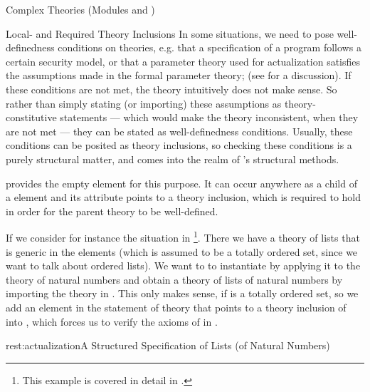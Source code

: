 \begin{tchapter}[id=complex-theories,short=Complex Theories]{Complex Theories (Modules
     and )}
\begin{tsection}[id=restricting-inference,short=Local/Required Theory Inclusions]{Local- and Required Theory Inclusions}
  In some situations, we need to pose well-definedness conditions on theories,
  e.g. that a specification of a program follows a certain security model, or that
  a parameter theory used for actualization satisfies the assumptions made in the
  formal parameter theory; (see  for a discussion). If these
  conditions are not met, the theory intuitively does not make sense. So rather
  than simply stating (or importing) these assumptions as theory-constitutive
  statements --- which would make the theory inconsistent, when they are not met
  --- they can be stated as well-definedness conditions. Usually, these conditions
  can be posited as theory inclusions, so checking these conditions is a purely
  structural matter, and comes into the realm of \omdoc's structural methods.

  \omdoc provides the empty  element for this purpose. It can
  occur anywhere as a child of a  element and its
   attribute points to a theory inclusion, which is
  required to hold in order for the parent theory to be well-defined.
  
  If we consider for instance the situation in
  \footnote{This example is covered in detail in
    .}.  There we have a theory  of lists that is
  generic in the elements (which is assumed to be a totally ordered set, since we want to
  talk about ordered lists). We want to to instantiate  by applying it
  to the theory  of natural numbers and obtain a theory
   of lists of natural numbers by importing the theory
   in . This only makes sense, if
   is a totally ordered set, so we add an  element
  in the statement of theory  that points to a theory inclusion of
   into , which forces us to verify the axioms of
   in .

\begin{myfig}{rest:actualization}{A Structured Specification of Lists (of
    Natural Numbers)}
  \begin{tikzpicture}\end{tikzpicture}\quad
\end{myfig}


\end{tsection}
\end{tchapter}
